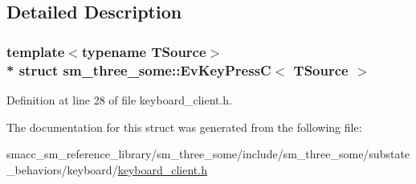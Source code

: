 \subsection{Detailed Description}
\subsubsection*{template$<$typename T\+Source$>$\\*
struct sm\+\_\+three\+\_\+some\+::\+Ev\+Key\+Press\+C$<$ T\+Source $>$}



Definition at line 28 of file keyboard\+\_\+client.\+h.



The documentation for this struct was generated from the following file\+:\begin{DoxyCompactItemize}
\item 
smacc\+\_\+sm\+\_\+reference\+\_\+library/sm\+\_\+three\+\_\+some/include/sm\+\_\+three\+\_\+some/substate\+\_\+behaviors/keyboard/\hyperlink{keyboard__client_8h}{keyboard\+\_\+client.\+h}\end{DoxyCompactItemize}
